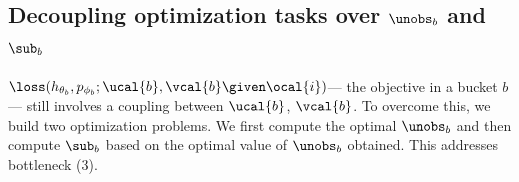 \documentclass[letterpaper]{article}
\renewcommand{\cite}{\citep}
\begin{document}
\subsection{Decoupling optimization tasks over $\unobs_b$ and $\sub_b$ }
\label{subsec:F}
 $\loss(h_{\theta_b},p_{\phi_b};\ucal{b} , \vcal{b} \given \ocal{i})$--- the objective in a bucket $b$--- still involves a coupling between $\ucal{b}$, $\vcal{b}$. To overcome this, we build two optimization problems. We first compute the optimal $\unobs_b$ and then compute $\sub_b$ based on the optimal value of $\unobs_b$ obtained.  This addresses bottleneck (3).
\end{document}
